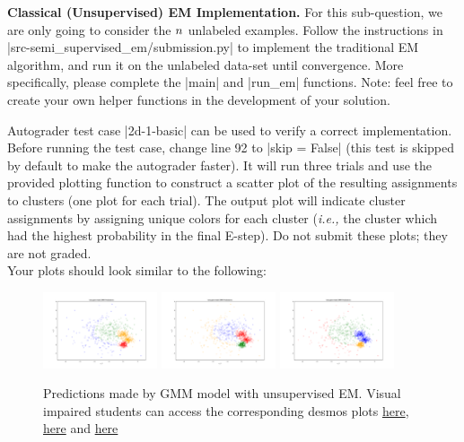 \item {}
\textbf{Classical (Unsupervised) EM Implementation.}
For this sub-question, we are only going to consider the ${n}$ unlabeled examples. Follow the instructions in |src-semi_supervised_em/submission.py| to implement the traditional EM algorithm, and run it on the unlabeled data-set until convergence.
More specifically, please complete the |main| and |run_em| functions. Note: feel free to create your own helper functions in the development of your solution.

Autograder test case |2d-1-basic| can be used to verify a correct implementation. Before running the test case, change line 92 to |skip = False| (this test is skipped by default to make the autograder faster).  It will run three trials and use the provided plotting function to construct a scatter plot of the resulting assignments to clusters (one plot for each trial). The output plot will indicate cluster assignments by assigning unique colors for each cluster (\emph{i.e.,} the cluster which had the highest probability in the final E-step).  Do not submit these plots; they are not graded.\\

Your plots should look similar to the following:

  \begin{figure}[H]
    \centering
    \includegraphics[width=0.3\textwidth]{02-semi_supervised_em/pred_0.pdf}
    \includegraphics[width=0.3\textwidth]{02-semi_supervised_em/pred_1.pdf}
    \includegraphics[width=0.3\textwidth]{02-semi_supervised_em/pred_2.pdf}
    \caption{Predictions made by GMM model with unsupervised EM. Visual impaired students can access the corresponding desmos plots \href{https://www.desmos.com/calculator/y0yq8ahnvk}{here}, \href{https://www.desmos.com/calculator/leymlqxcql}{here} and \href{https://www.desmos.com/calculator/open1qetjj}{here}}
  \end{figure}
